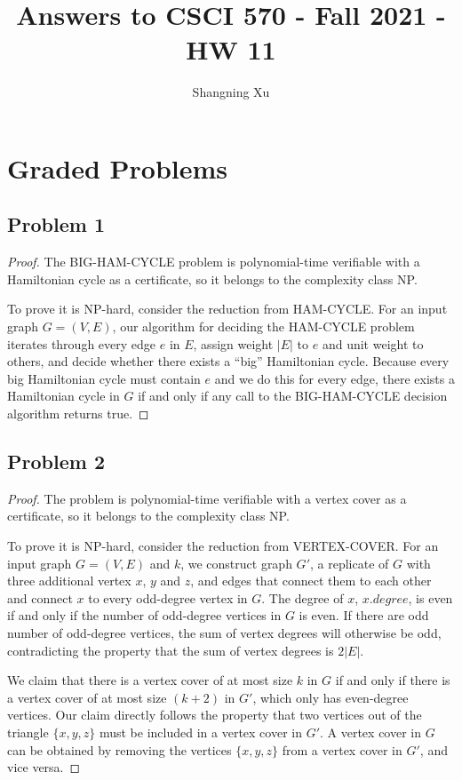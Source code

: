 \documentclass{article}
\title{Answers to CSCI 570 - Fall 2021 - HW 11}
\author{Shangning Xu}
\begin{document}
\maketitle
 
\section*{Graded Problems}

\subsection*{Problem 1}

\begin{proof}
    The BIG-HAM-CYCLE problem is polynomial-time verifiable with a Hamiltonian cycle as a certificate, so it belongs to the complexity class NP.

    To prove it is NP-hard, consider the reduction from HAM-CYCLE. For an input graph $G = (V, E)$, our algorithm for deciding the HAM-CYCLE problem iterates through every edge $e$ in $E$, assign weight $|E|$ to $e$ and unit weight to others, and decide whether there exists a ``big'' Hamiltonian cycle. Because every big Hamiltonian cycle must contain $e$ and we do this for every edge, there exists a Hamiltonian cycle in $G$ if and only if any call to the BIG-HAM-CYCLE decision algorithm returns true.
\end{proof}

\subsection*{Problem 2}

\begin{proof}
    The problem is polynomial-time verifiable with a vertex cover as a certificate, so it belongs to the complexity class NP.

    To prove it is NP-hard, consider the reduction from VERTEX-COVER. For an input graph $G = (V, E)$ and $k$, we construct graph $G'$, a replicate of $G$ with three additional vertex $x$, $y$ and $z$, and edges that connect them to each other and connect $x$ to every odd-degree vertex in $G$. The degree of $x$, $x.degree$, is even if and only if the number of odd-degree vertices in $G$ is even. If there are odd number of odd-degree vertices, the sum of vertex degrees will otherwise be odd, contradicting the property that the sum of vertex degrees is $2|E|$.
    
    We claim that there is a vertex cover of at most size $k$ in $G$ if and only if there is a vertex cover of at most size $(k + 2)$ in $G'$, which only has even-degree vertices. Our claim directly follows the property that two vertices out of the triangle $\{x, y, z\}$ must be included in a vertex cover in $G'$. A vertex cover in $G$ can be obtained by removing the vertices $\{x, y, z\}$ from a vertex cover in $G'$, and vice versa.
\end{proof}
\end{document}
